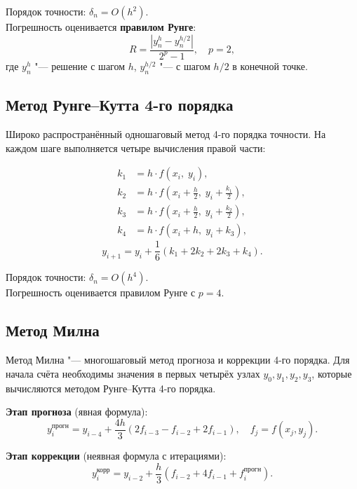 \documentclass[a4paper,12pt]{article}
\begin{document}
\noindent Порядок точности: $\delta_n = O(h^2)$.\\
Погрешность оценивается \textbf{правилом Рунге}:
\begin{equation}
    R = \frac{|y^h_n - y^{h/2}_n|}{2^p - 1}, \quad p = 2,
\end{equation}
где $y^h_n$ "--- решение с шагом $h$, $y^{h/2}_n$ "--- с шагом $h/2$ в конечной точке.

\subsection{Метод Рунге--Кутта 4-го порядка}

Широко распространённый одношаговый метод 4-го порядка точности.
На каждом шаге выполняется четыре вычисления правой части:

\begin{align}
    k_1 &= h \cdot f(x_i,\; y_i), \\
    k_2 &= h \cdot f\!\left(x_i + \tfrac{h}{2},\; y_i + \tfrac{k_1}{2}\right), \\
    k_3 &= h \cdot f\!\left(x_i + \tfrac{h}{2},\; y_i + \tfrac{k_2}{2}\right), \\
    k_4 &= h \cdot f(x_i + h,\; y_i + k_3),
\end{align}
\begin{equation}
    \boxed{y_{i+1} = y_i + \frac{1}{6}(k_1 + 2k_2 + 2k_3 + k_4)}.
\end{equation}

\noindent Порядок точности: $\delta_n = O(h^4)$.\\
Погрешность оценивается правилом Рунге с $p = 4$.

\subsection{Метод Милна}

Метод Милна "--- многошаговый метод прогноза и коррекции 4-го порядка.
Для начала счёта необходимы значения в первых четырёх узлах
$y_0, y_1, y_2, y_3$, которые вычисляются методом Рунге--Кутта 4-го порядка.

\textbf{Этап прогноза} (явная формула):
\begin{equation}
    \boxed{y_i^{\text{прогн}} = y_{i-4} + \frac{4h}{3}\left(2f_{i-3} - f_{i-2} + 2f_{i-1}\right)},
    \quad f_j = f(x_j, y_j).
\end{equation}

\textbf{Этап коррекции} (неявная формула с итерациями):
\begin{equation}
    \boxed{y_i^{\text{корр}} = y_{i-2} + \frac{h}{3}\left(f_{i-2} + 4f_{i-1} + f_i^{\text{прогн}}\right)}.
\end{equation}
\end{document}

